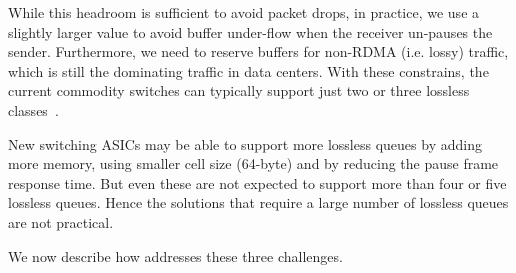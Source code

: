 While this headroom is sufficient to avoid packet drops, in practice, we use a
slightly larger value to avoid buffer under-flow when the receiver un-pauses the
sender.  Furthermore, we need to reserve buffers for non-RDMA (i.e. lossy)
traffic, which is still the dominating traffic in data centers. With these
constrains, the current commodity switches can typically support just two or
three lossless classes~\cite{rdmaatscale}.

New switching ASICs may be able to support more lossless queues by adding more
memory, using smaller cell size (64-byte) and by reducing the pause frame
response time. But even these are not expected to support more than four or five
lossless queues. Hence the solutions that require a large number of lossless
queues are not practical. 

We now describe how \sysname{} addresses these three challenges. 
